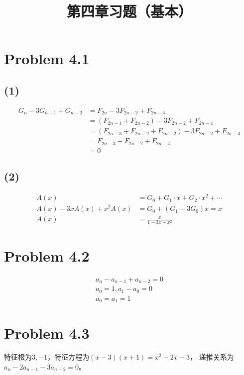\documentclass{article}
\begin{document}
 
 
\title{第四章习题（基本）}
\maketitle

\section*{Problem 4.1}
\subsection*{(1)}
\begin{align*}
    G_{n} - 3G_{n-1} + G_{n-2} &= 
    F_{2n} - 3F_{2n-2} + F_{2n-4} \\&= 
    (F_{2n-1} + F_{2n-2}) - 3F_{2n-2} + F_{2n-4} \\&= 
    (F_{2n-3} + F_{2n-2} + F_{2n-2}) - 3F_{2n-2} + F_{2n-4} \\&= 
    F_{2n-3} - F_{2n-2} + F_{2n-4} \\&= 0
\end{align*}
\subsection*{(2)}
\begin{align*}
    A(x) &= G_0 + G_1\cdot x + G_2 \cdot x^2 + \cdots\\
    A(x) - 3xA(x) + x^2A(x) &= G_0 + (G_1 - 3G_0)x = x\\
    A(x) &= \frac{x}{1 - 3x + x^2}
\end{align*}

\section*{Problem 4.2}
\begin{align*}
    a_n - a_{n-1} + a_{n-2} = 0\\
    a_0 = 1, a_1 - a_0 = 0\\
    a_0 = a_1 = 1
\end{align*}

\section*{Problem 4.3}
特征根为$3, -1$，特征方程为$(x-3)(x+1) = x^2 - 2x - 3$，
递推关系为$a_n - 2a_{n-1} - 3a_{n-2} = 0$。
\end{document}
